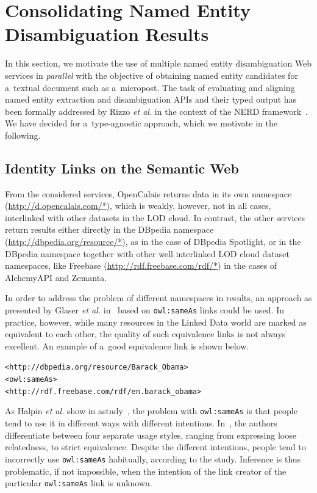 \section{Consolidating Named Entity Disambiguation Results} 
\label{sec:consolidate}

In this section, we motivate the use of multiple
named entity disambiguation Web services in \emph{parallel}
with the objective of obtaining named entity candidates
for a~textual document such as a~micropost.
The task of evaluating and aligning named entity extraction and
disambiguation APIs and their typed output
has been formally addressed by Rizzo \emph{et al.}
in the context of the NERD
framework~\cite{rizzo2011nerd,rizzo2012nerd}.
We have decided for a~type-agnostic approach,
which we motivate in the following.

\subsection{Identity Links on the Semantic Web}
\label{sec:sameasorg}

From the considered services, OpenCalais returns data in its
own namespace (\url{http://d.opencalais.com/*}), which is
weakly, however, not in all cases,
interlinked with other datasets in the LOD cloud.
In contrast, the other services return results either directly
in the DBpedia namespace (\url{http://dbpedia.org/resource/*}),
as in the case of DBpedia Spotlight,
or in the DBpedia namespace together with other
well interlinked LOD cloud dataset namespaces, like Freebase
(\url{http://rdf.freebase.com/rdf/*}) in the cases of
AlchemyAPI and Zemanta.

In order to address the problem of different namespaces in results,
an approach as presented by Glaser \emph{et al.} 
in~\cite{glaser2009sameas} based on \texttt{owl:sameAs} links
could be used.
In practice, however, while many resources in the Linked Data
world are marked as equivalent to each other,
the quality of such equivalence links is not always excellent.
An example of a~good equivalence link is shown below.

\texttt{<http://dbpedia.org/resource/Barack\_Obama>}\\
\indent \texttt{<owl:sameAs>}\\
\indent \texttt{<http://rdf.freebase.com/rdf/en.barack\_obama>}

\noindent As Halpin \emph{et al.} show
in astudy~\cite{halpin2010owlsameas}, the problem
with \texttt{owl:sameAs} is that people tend to use it
in different ways with different intentions.
In~\cite{halpin2010owlsameas},
the authors differentiate between four separate usage styles,
ranging from expressing loose relatedness,
to strict equivalence.
Despite the different intentions, people tend to incorrectly use
\texttt{owl:sameAs} habitually, according to the study.
Inference is thus problematic, if not impossible,
when the intention of the link creator of the particular
\texttt{owl:sameAs} link is unknown.


